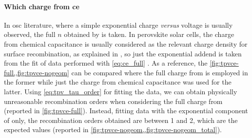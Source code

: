 		\paragraph{Which charge from \gls{ce}}
		In \gls{osc} literature, where a simple exponential charge \textsl{versus} voltage is usually observed, the full $n$ obtained by  is taken.
		In perovskite solar cells, the charge from chemical capacitance is usually considered as the relevant charge density for surface recombination, as explained in , so just the exponential addend is taken from the fit of  data performed with \cref{eq:ce_full} \cite{Du2018,Gelmetti2019,Wheeler2017}.
		As a reference, the \cref{fig:tpvce-full,,fig:tpvce-nogeom} can be compared where the full charge from  is employed in the former while just the charge from chemical capacitance was used for the latter.
		Using \cref{eq:tpv_tau_order} for fitting the data, we can obtain physically unreasonable recombination orders when considering the full charge from  (reported in \cref{fig:tpvce-full}).
		Instead, fitting data with the exponential component of  only, the recombination orders obtained are between 1 and 2, which are the expected values (reported in \cref{fig:tpvce-nogeom,,fig:tpvce-nogeom_total}).

